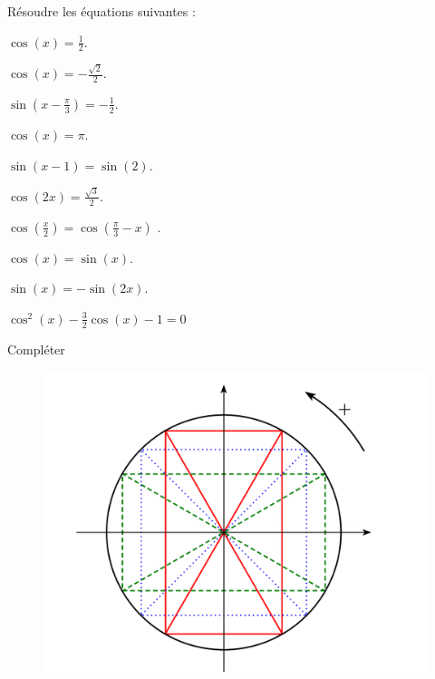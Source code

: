 \documentclass{article}
\begin{document}
\begin{exercice}[\'Equations]
	Résoudre les équations suivantes :
	\begin{multicols}{2}
		\begin{questions}
			\item $\cos(x) = \frac{1}{2}$.
			\item $\cos(x) = -\frac{\sqrt{2}}{2}$.
			\item $\sin(x - \frac{\pi}{3}) = -\frac{1}{2}$.
			\item $\cos(x) = \pi$.
			\item $\sin(x-1) = \sin(2)$.
			\item $\cos(2x) = \frac{\sqrt{3}}{2}$.
			\item $\cos(\frac{x}{2}) = \cos(\frac{\pi}{3}-x)$ .
			\item $\cos(x) = \sin(x)$.
			\item $\sin(x) = -\sin(2x)$.
			\item $\cos^2(x)-\frac{3}{2}\cos(x)-1 = 0$
		\end{questions}
	\end{multicols}
	
\end{exercice}	

\newpage
\begin{exercice}
	Compléter
	\begin{center}
	\begin{figure}[h!]
		\includegraphics[scale=0.8]{../cercle_trigo}
	\end{figure}
	\end{center}
\end{exercice}
	
\end{document}
